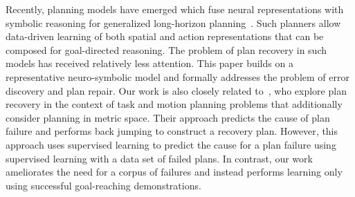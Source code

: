 Recently, planning models have emerged which fuse neural representations with symbolic reasoning for generalized long-horizon planning~\citep{mao2022pdsketch,Kalithasan2022LearningNP,zhu2021hierarchical,xu2019regression,shridhar2022cliport,Mao2019TheNC}. 
%
Such planners allow data-driven learning of both spatial and action representations that can be composed for goal-directed reasoning. 
%
The problem of plan recovery in such models has received relatively less attention. This paper builds on a representative neuro-symbolic model and formally addresses the problem of error discovery and plan repair. 
%
Our work is also closely related to~\citep{sung2023learning}, who explore plan recovery in the context of task and motion planning problems that additionally consider planning in metric space. Their approach predicts the cause of plan failure and performs back jumping to construct a recovery plan. However, this approach uses supervised learning to predict the cause for a plan failure using supervised learning with a data set of failed plans. In contrast, our work ameliorates the need for a corpus of failures and instead performs learning only using successful goal-reaching demonstrations. 

%
